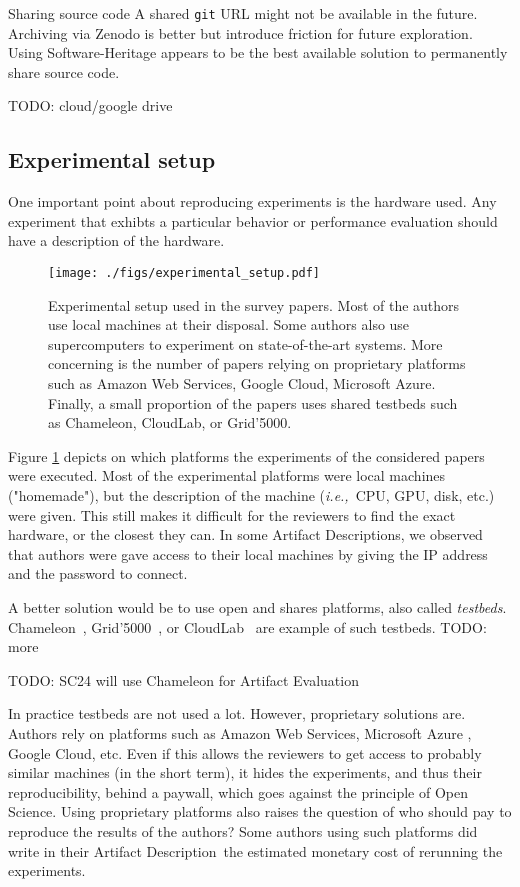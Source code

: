 \documentclass[sigconf,natbib=false]{acmart}
\newcommand{\ie}{\emph{i.e.,}}
\newcommand{\ad}{Artifact Description}
\newcommand{\aeval}{Artifact Evaluation}
\newcommand{\todo}[1]{{\color{red}TODO: #1}}
\begin{document}
\begin{lesson}{Sharing source code}{}
  A shared \texttt{git} URL might not be available in the future.
  Archiving via Zenodo is better but introduce friction for future exploration.
  Using Software-Heritage appears to be the best available solution to permanently share source code.
\end{lesson}

\todo{cloud/google drive}

\subsection{Experimental setup}\label{sec:sop:expe}

One important point about reproducing experiments is the hardware used.
Any experiment that exhibts a particular behavior or performance evaluation should have a description of the hardware. 

\begin{figure}
  \centering
  \texttt{[image: ./figs/experimental\_setup.pdf]}
  \caption{Experimental setup used in the survey papers. Most of the authors use local machines at their disposal. Some authors also use supercomputers to experiment on state-of-the-art systems. More concerning is the number of papers relying on proprietary platforms such as Amazon Web Services, Google Cloud, Microsoft Azure. Finally, a small proportion of the papers uses shared testbeds such as Chameleon, CloudLab, or Grid'5000.}\label{fig:experimental_setup}
\end{figure}

Figure \ref{fig:experimental_setup} depicts on which platforms the experiments of the considered papers were executed.
Most of the experimental platforms were local machines ("homemade"), but the description of the machine (\ie\ CPU, GPU, disk, etc.) were given.
This still makes it difficult for the reviewers to find the exact hardware, or the closest they can.
In some \ad s, we observed that authors were gave access to their local machines by giving the IP address and the password to connect.


A better solution would be to use open and shares platforms, also called \emph{testbeds}.
Chameleon\ \cite{chameleon}, Grid'5000\ \cite{grid5000}, or CloudLab\ \cite{cloudlab} are example of such testbeds.
\todo{more \cite{nussbaum2017testbeds}}

\todo{SC24 will use Chameleon for \aeval}

In practice testbeds are not used a lot.
However, proprietary solutions are.
Authors rely on platforms such as Amazon Web Services, Microsoft Azure , Google Cloud, etc.
Even if this allows the reviewers to get access to probably similar machines (in the short term), it hides the experiments, and thus their reproducibility, behind a paywall, which goes against the principle of Open Science.
Using proprietary platforms also raises the question of who should pay to reproduce the results of the authors?
Some authors using such platforms did write in their \ad\ the estimated monetary cost of rerunning the experiments.
\end{document}
